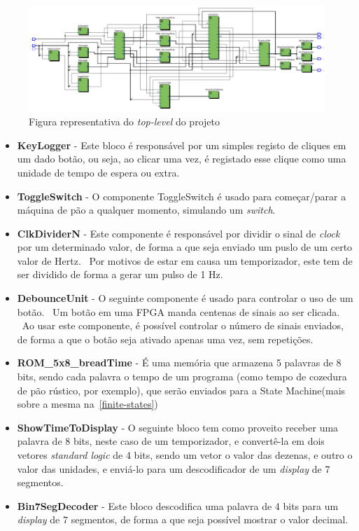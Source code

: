 \documentclass{article}
\begin{document}
        \begin{figure}[H]
            \label{fig:bread-machine}
            \centering
            \includegraphics[scale=0.6]{BreadMachine3}
            \caption{Figura representativa do \textit{top-level} do projeto}
        \end{figure}

        \begin{itemize}
            \item[\textbf{\textrightarrow}] \textbf{KeyLogger} - Este bloco é responsável por um simples registo de cliques em um dado botão, ou seja, ao clicar uma vez, é registado esse clique como uma unidade de tempo de espera ou extra.
            \item[\textbf{\textrightarrow}] \textbf{ToggleSwitch} - O componente ToggleSwitch é usado para começar/parar a máquina de pão a qualquer momento, simulando um \textit{switch}.
            \item[\textbf{\textrightarrow}] \textbf{ClkDividerN} - Este componente é responsável por dividir o sinal de \textit{clock} por um determinado valor, de forma a que seja enviado um puslo  de um certo valor de Hertz. \ Por motivos de estar em causa um temporizador, este tem de ser dividido de forma a gerar um pulso de 1 Hz.
            \item[\textbf{\textrightarrow}] \textbf{DebounceUnit} - O seguinte componente é usado para controlar o uso de um botão. \ Um botão em uma FPGA manda centenas de sinais ao ser clicada. \ Ao usar este componente, é possível controlar o número de sinais enviados, de forma a que o botão seja ativado apenas uma vez, sem repetições.
            \item[\textbf{\textrightarrow}] \textbf{ROM\_5x8\_breadTime} - É uma memória que armazena 5 palavras de 8 bits, sendo cada palavra o tempo de um programa (como tempo de cozedura de pão rústico, por exemplo), que serão enviados para a State Machine(mais sobre a mesma na~\ref{finite-states})
            \item[\textbf{\textrightarrow}] \textbf{ShowTimeToDisplay} - O seguinte bloco tem como proveito receber uma palavra de 8 bits, neste caso de um temporizador, e convertê-la em dois vetores \textit{standard logic} de 4 bits, sendo um vetor o valor das dezenas, e outro o valor das unidades, e enviá-lo para um descodificador de um \textit{display} de 7 segmentos.
            \item[\textbf{\textrightarrow}] \textbf{Bin7SegDecoder} - Este bloco descodifica uma palavra de 4 bits para um \textit{display} de 7 segmentos, de forma a que seja possível mostrar o valor decimal.
        \end{itemize}
\end{document}
